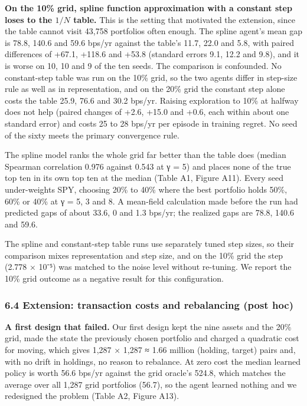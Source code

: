 \documentclass[
  11pt]{article}
\begin{document}
\textbf{On the 10\% grid, spline function approximation with a constant
step loses to the \(1/N\) table.} This is the setting that motivated the
extension, since the table cannot visit 43,758 portfolios often enough.
The spline agent's mean gap is 78.8, 140.6 and 59.6 bps/yr against the
table's 11.7, 22.0 and 5.8, with paired differences of +67.1, +118.6 and
+53.8 (standard errors 9.1, 12.2 and 9.8), and it is worse on 10, 10 and
9 of the ten seeds. The comparison is confounded. No constant-step table
was run on the 10\% grid, so the two agents differ in step-size rule as
well as in representation, and on the 20\% grid the constant step alone
costs the table 25.9, 76.6 and 30.2 bps/yr. Raising exploration to 10\%
at halfway does not help (paired changes of +2.6, +15.0 and +0.6, each
within about one standard error) and costs 25 to 28 bps/yr per episode
in training regret. No seed of the sixty meets the primary convergence
rule.

The spline model ranks the whole grid far better than the table does
(median Spearman correlation 0.976 against 0.543 at γ = 5) and places
none of the true top ten in its own top ten at the median (Table A1,
Figure A11). Every seed under-weights SPY, choosing 20\% to 40\% where
the best portfolio holds 50\%, 60\% or 40\% at γ = 5, 3 and 8. A
mean-field calculation made before the run had predicted gaps of about
33.6, 0 and 1.3 bps/yr; the realized gaps are 78.8, 140.6 and 59.6.

The spline and constant-step table runs use separately tuned step sizes,
so their comparison mixes representation and step size, and on the 10\%
grid the step (2.778 × 10⁻⁵) was matched to the noise level without
re-tuning. We report the 10\% grid outcome as a negative result for this
configuration.

\subsubsection{6.4 Extension: transaction costs and rebalancing (post
hoc)}\label{extension-transaction-costs-and-rebalancing-post-hoc}

\textbf{A first design that failed.} Our first design kept the nine
assets and the 20\% grid, made the state the previously chosen portfolio
and charged a quadratic cost for moving, which gives 1,287 × 1,287 ≈
1.66 million (holding, target) pairs and, with no drift in holdings, no
reason to rebalance. At zero cost the median learned policy is worth
56.6 bps/yr against the grid oracle's 524.8, which matches the average
over all 1,287 grid portfolios (56.7), so the agent learned nothing and
we redesigned the problem (Table A2, Figure A13).
\end{document}
